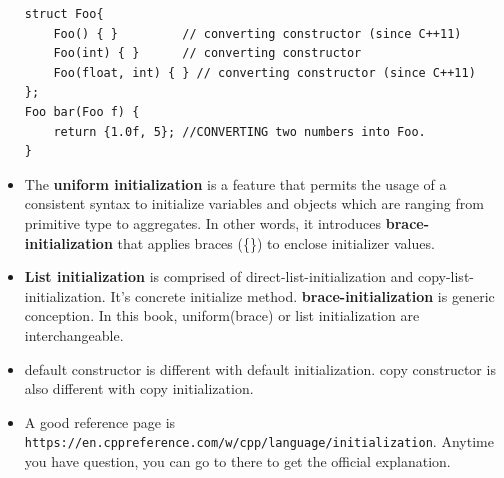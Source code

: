 \documentclass[a4paper,11pt,twoside]{book}
\begin{document}
\begin{itemize}
\begin{lstlisting}[numbers=none]
struct Foo{
	Foo() { }         // converting constructor (since C++11)  
	Foo(int) { }      // converting constructor
	Foo(float, int) { } // converting constructor (since C++11)
};
Foo bar(Foo f) {
	return {1.0f, 5}; //CONVERTING two numbers into Foo.
}
\end{lstlisting}	

	\item The \textbf{uniform initialization} is a feature that permits the usage of a consistent syntax to initialize variables and objects which are ranging from primitive type to aggregates. In other words, it introduces \textbf{brace-initialization} that applies braces (\{\}) to enclose initializer values.
	
	\item \textbf{List initialization} is comprised of direct-list-initialization and copy-list-initialization. It's concrete initialize method. \textbf{brace-initialization} is generic conception. In this book, uniform(brace) or list initialization are interchangeable. 
	
	\item default constructor is different with default initialization. copy constructor is also different with copy initialization.
	
	\item A good reference page is \verb|https://en.cppreference.com/w/cpp/language/initialization|. Anytime you have question, you can go to there to get the official explanation. 
\end{itemize}
\end{document}
